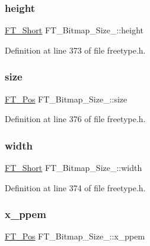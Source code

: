 \subsubsection{\texorpdfstring{height}{height}}
{\footnotesize\ttfamily \mbox{\hyperlink{fttypes_8h_aa7279be89046a2563cd3d4d6651fbdcf}{F\+T\+\_\+\+Short}} F\+T\+\_\+\+Bitmap\+\_\+\+Size\+\_\+\+::height}



Definition at line 373 of file freetype.\+h.

\mbox{\label{struct_f_t___bitmap___size___a1db23a6220fb6bcb712430821a6e5352}} 
\subsubsection{\texorpdfstring{size}{size}}
{\footnotesize\ttfamily \mbox{\hyperlink{ftimage_8h_af5f230f4b253d4c7715fd2e595614c90}{F\+T\+\_\+\+Pos}} F\+T\+\_\+\+Bitmap\+\_\+\+Size\+\_\+\+::size}



Definition at line 376 of file freetype.\+h.

\mbox{\label{struct_f_t___bitmap___size___ab9da94223f75a89a649d1e6d018b17f1}} 
\subsubsection{\texorpdfstring{width}{width}}
{\footnotesize\ttfamily \mbox{\hyperlink{fttypes_8h_aa7279be89046a2563cd3d4d6651fbdcf}{F\+T\+\_\+\+Short}} F\+T\+\_\+\+Bitmap\+\_\+\+Size\+\_\+\+::width}



Definition at line 374 of file freetype.\+h.

\mbox{\label{struct_f_t___bitmap___size___a6f877a792d2dc93328037c928979215f}} 
\subsubsection{\texorpdfstring{x\_ppem}{x\_ppem}}
{\footnotesize\ttfamily \mbox{\hyperlink{ftimage_8h_af5f230f4b253d4c7715fd2e595614c90}{F\+T\+\_\+\+Pos}} F\+T\+\_\+\+Bitmap\+\_\+\+Size\+\_\+\+::x\+\_\+ppem}



